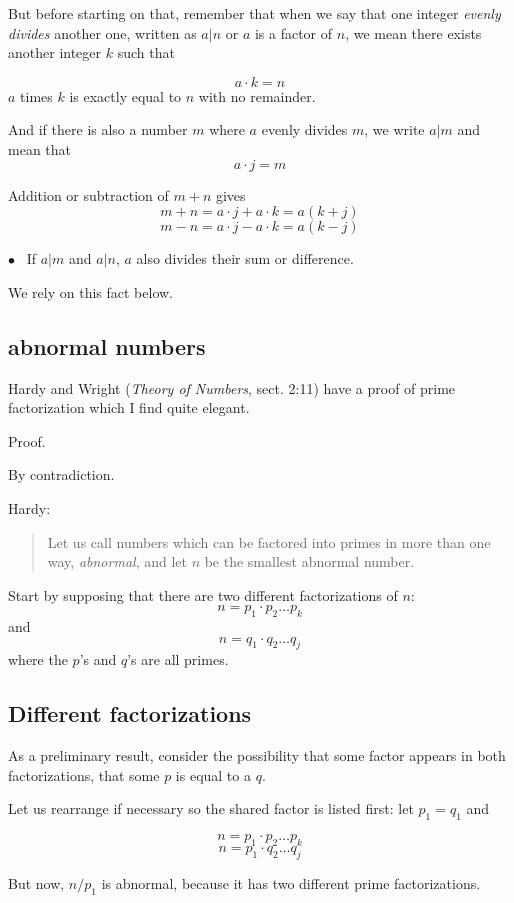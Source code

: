\documentclass[11pt, oneside]{article}
\begin{document}
But before starting on that, remember that when we say that one integer \emph{evenly divides} another one, written as $a|n$ or $a$ is a factor of $n$, we mean there exists another integer $k$ such that

\[ a \cdot k = n \]
$a$ times $k$ is exactly equal to $n$ with no remainder.

And if there is also a number $m$ where $a$ evenly divides $m$, we write $a|m$ and mean that
\[ a \cdot j = m \]

Addition or subtraction of $m + n$ gives
\[ m + n = a \cdot j + a \cdot k = a(k + j) \]
\[ m - n = a \cdot j - a \cdot k = a(k - j) \]

$\bullet$ \ If $a|m$ and $a|n$, $a$ also divides their sum or difference.

We rely on this fact below.

\subsection*{abnormal numbers}

Hardy and Wright (\emph{Theory of Numbers}, sect. 2:11) have a proof of prime factorization which I find quite elegant.

Proof.

By contradiction.

Hardy:
\begin{quote}Let us call numbers which can be factored into primes in more than one way, \emph{abnormal}, and let $n$ be the smallest abnormal number.\end{quote}

Start by supposing that there are two different factorizations of $n$:
\[ n = p_1 \cdot p_2 \dots p_k \]
and
\[ n = q_1 \cdot q_2 \dots q_j \]
where the $p$'s and $q$'s are all primes.

\subsection*{Different factorizations}

As a preliminary result, consider the possibility that some factor appears in both factorizations, that some $p$ is equal to a $q$.

Let us rearrange if necessary so the shared factor is listed first:  let $p_1 = q_1$ and

\[ n = p_1 \cdot p_2 \dots p_k \]
\[ n = p_1 \cdot q_2 \dots q_j \]

But now, $n/p_1$ is abnormal, because it has two different prime factorizations.  
\end{document}
